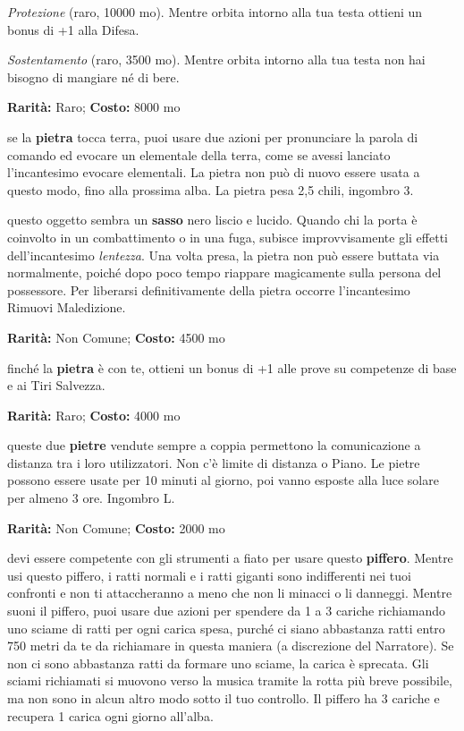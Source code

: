 \begin{multicols}{2}
\emph{Protezione} (raro, 10000 mo). Mentre orbita intorno alla tua testa ottieni un bonus di +1 alla Difesa.

\emph{Sostentamento} (raro, 3500 mo). Mentre orbita intorno alla tua testa non hai bisogno di mangiare né di bere.


\textbf{Rarità:} Raro; \textbf{Costo:} 8000 mo

se la \textbf{pietra} tocca terra, puoi usare due azioni per pronunciare la parola di comando ed evocare un elementale della terra, come se avessi lanciato l'incantesimo evocare elementali. La pietra non può di nuovo essere usata a questo modo, fino alla prossima alba. La pietra pesa 2,5 chili, ingombro 3.


questo oggetto sembra un \textbf{sasso} nero liscio e lucido. Quando chi la porta è coinvolto in un combattimento o in una fuga, subisce improvvisamente gli effetti dell'incantesimo \emph{lentezza}. Una volta presa, la pietra non può essere buttata via normalmente, poiché dopo poco tempo riappare magicamente sulla persona del possessore. Per liberarsi definitivamente della pietra occorre l'incantesimo Rimuovi Maledizione.


\textbf{Rarità:} Non Comune; \textbf{Costo:} 4500 mo

finché la \textbf{pietra} è con te, ottieni un bonus di +1 alle prove su competenze di base e ai Tiri Salvezza.


\textbf{Rarità:} Raro; \textbf{Costo:} 4000 mo

queste due \textbf{pietre} vendute sempre a coppia permettono la comunicazione a distanza tra i loro utilizzatori. Non c'è limite di distanza o Piano. Le pietre possono essere usate per 10 minuti al giorno, poi vanno esposte alla luce solare per almeno 3 ore. Ingombro L.


\textbf{Rarità:} Non Comune; \textbf{Costo:} 2000 mo

devi essere competente con gli strumenti a fiato per usare questo \textbf{piffero}. Mentre usi questo piffero, i ratti normali e i ratti giganti sono indifferenti nei tuoi confronti e non ti attaccheranno a meno che non li minacci o li danneggi. Mentre suoni il piffero, puoi usare due azioni per spendere da 1 a 3 cariche richiamando uno sciame di ratti per ogni carica spesa, purché ci siano abbastanza ratti entro 750 metri da te da richiamare in questa maniera (a discrezione del Narratore). Se non ci sono abbastanza ratti da formare uno sciame, la carica è sprecata. Gli sciami richiamati si muovono verso la musica tramite la rotta più breve possibile, ma non sono in alcun altro modo sotto il tuo controllo. Il piffero ha 3 cariche e recupera 1 carica ogni giorno all'alba.


\end{multicols}

